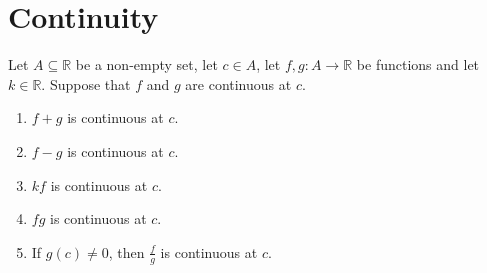 \section{Continuity}
\setcounter{theorem}{4}
\begin{theorem}
	\label{theorem-3.3.5}
	Let $A \subseteq \mathbb{R}$ be a non-empty set, let $c \in A$, let $f, g : A \to \mathbb{R}$ be functions and let $k \in \mathbb{R}$. Suppose that $f$ and $g$ are continuous at $c$.
	\begin{enumerate}
		\item $f + g$ is continuous at $c$.
		\item $f - g$ is continuous at $c$.
		\item $kf$ is continuous at $c$.
		\item $fg$ is continuous at $c$.
		\item If $g\left(c\right) \neq 0$, then $\frac{f}{g}$ is continuous at $c$.
	\end{enumerate}
\end{theorem}
